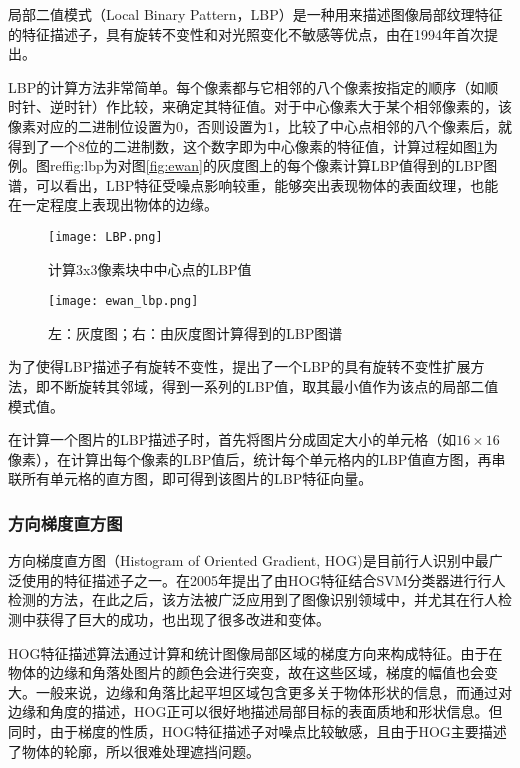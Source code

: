   局部二值模式（Local Binary Pattern，LBP）是一种用来描述图像局部纹理特征的特征描述子，具有旋转不变性和对光照变化不敏感等优点，由\citet{ojala1994performance}在1994年首次提出。

  LBP的计算方法非常简单。每个像素都与它相邻的八个像素按指定的顺序（如顺时针、逆时针）作比较，来确定其特征值。对于中心像素大于某个相邻像素的，该像素对应的二进制位设置为0，否则设置为1，比较了中心点相邻的八个像素后，就得到了一个8位的二进制数，这个数字即为中心像素的特征值，计算过程如图\ref{fig:lbp_procedure}为例。图ref{fig:lbp}为对图\ref{fig:ewan}的灰度图上的每个像素计算LBP值得到的LBP图谱，可以看出，LBP特征受噪点影响较重，能够突出表现物体的表面纹理，也能在一定程度上表现出物体的边缘。

\begin{figure}[htb]
  \centering
  \texttt{[image: LBP.png]}
  \caption{计算3x3像素块中中心点的LBP值}
  \label{fig:lbp_procedure}
\end{figure}

\begin{figure}[htb]
  \centering
  \texttt{[image: ewan\_lbp.png]}
  \caption{左：灰度图；右：由灰度图计算得到的LBP图谱}
  \label{fig:lbp}
\end{figure}

  为了使得LBP描述子有旋转不变性，\citet{ojala2002multiresolution}提出了一个LBP的具有旋转不变性扩展方法，即不断旋转其邻域，得到一系列的LBP值，取其最小值作为该点的局部二值模式值。

  在计算一个图片的LBP描述子时，首先将图片分成固定大小的单元格（如$16\times16$像素），在计算出每个像素的LBP值后，统计每个单元格内的LBP值直方图，再串联所有单元格的直方图，即可得到该图片的LBP特征向量。

\subsubsection{方向梯度直方图}

  方向梯度直方图（Histogram of Oriented Gradient, HOG)是目前行人识别中最广泛使用的特征描述子之一。\citet{dalal2005histograms}在2005年提出了由HOG特征结合SVM分类器进行行人检测的方法，在此之后，该方法被广泛应用到了图像识别领域中，并尤其在行人检测中获得了巨大的成功，也出现了很多改进和变体。

  HOG特征描述算法通过计算和统计图像局部区域的梯度方向来构成特征。由于在物体的边缘和角落处图片的颜色会进行突变，故在这些区域，梯度的幅值也会变大。一般来说，边缘和角落比起平坦区域包含更多关于物体形状的信息，而通过对边缘和角度的描述，HOG正可以很好地描述局部目标的表面质地和形状信息。但同时，由于梯度的性质，HOG特征描述子对噪点比较敏感，且由于HOG主要描述了物体的轮廓，所以很难处理遮挡问题。

